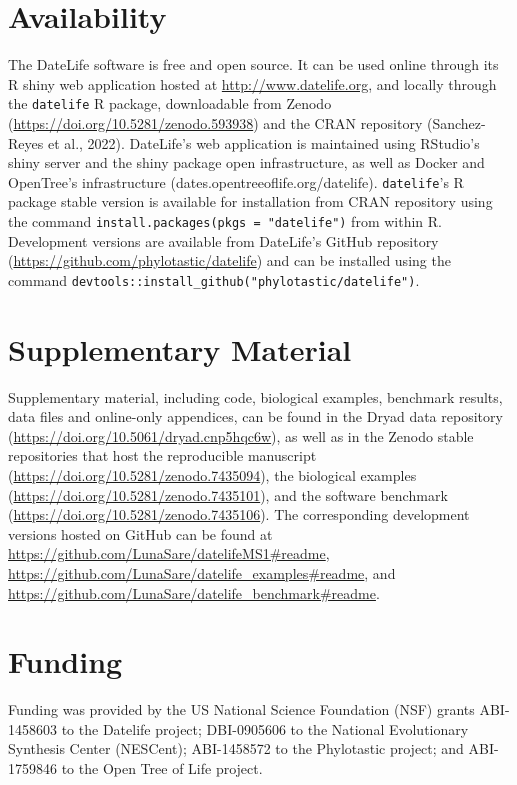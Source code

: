\documentclass[english,man]{apa6}
\begin{document}
\hypertarget{availability}{%
\section{Availability}\label{availability}}

The DateLife software is free and open source. It can be used online through its R shiny web application hosted at \url{http://www.datelife.org}, and locally through the \texttt{datelife} R package, downloadable from Zenodo (\url{https://doi.org/10.5281/zenodo.593938}) and the CRAN repository (Sanchez-Reyes et al., 2022).
DateLife's web application is maintained using RStudio's shiny server and the shiny package open infrastructure, as well as Docker and OpenTree's infrastructure (dates.opentreeoflife.org/datelife).
\texttt{datelife}'s R package stable version is available for installation from CRAN repository using the command \texttt{install.packages(pkgs\ =\ "datelife")} from within R.
Development versions are available from DateLife's GitHub repository (\url{https://github.com/phylotastic/datelife}) and can be installed using the command \texttt{devtools::install\_github("phylotastic/datelife")}.

\hypertarget{supplementary-material}{%
\section{Supplementary Material}\label{supplementary-material}}

Supplementary material, including code, biological examples, benchmark results, data files and online-only appendices, can be found in the Dryad data repository (\url{https://doi.org/10.5061/dryad.cnp5hqc6w}), as well as in the Zenodo stable repositories that host the reproducible manuscript (\url{https://doi.org/10.5281/zenodo.7435094}), the biological examples (\url{https://doi.org/10.5281/zenodo.7435101}), and the software benchmark (\url{https://doi.org/10.5281/zenodo.7435106}). The corresponding development versions hosted on GitHub can be found at \url{https://github.com/LunaSare/datelifeMS1\#readme}, \url{https://github.com/LunaSare/datelife_examples\#readme}, and \url{https://github.com/LunaSare/datelife_benchmark\#readme}.

\hypertarget{funding}{%
\section{Funding}\label{funding}}

Funding was provided by the US National Science Foundation (NSF) grants ABI-1458603 to the Datelife project; DBI-0905606 to the National Evolutionary Synthesis Center (NESCent); ABI-1458572 to the Phylotastic project; and ABI-1759846 to the Open Tree of Life project.
\end{document}
